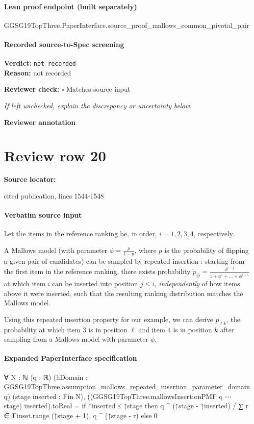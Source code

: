 \documentclass[10pt]{article}
\newcommand{\reviewerbox}{%
  \par\noindent\fbox{\parbox{0.96\linewidth}{\rule{0pt}{0.38in}}}\par
}
\newcommand{\reviewmatch}[1]{%
  \par\noindent\textbf{Reviewer check:} $\square$\; #1\par
  \noindent\emph{If left unchecked, explain the discrepancy or uncertainty below.}\par
}
\begin{document}
\paragraph{Lean proof endpoint (built separately)}\begin{ReviewVerbatim}
GGSG19TopThree.PaperInterface.source_proof_mallows_common_pivotal_pair
\end{ReviewVerbatim}

\paragraph{Recorded source-to-Spec screening}
\textbf{Verdict:} \texttt{not recorded}
\\
\textbf{Reason:} not recorded
\reviewmatch{Matches source input}
\noindent\textbf{Reviewer annotation}\par
\reviewerbox
\clearpage
\hypertarget{source-claim-909010c9cf279ba2}{}
\section*{Review row 20}
\textbf{Source locator:} {\footnotesize\raggedright cited publication, lines 1544-\allowbreak{}1548\par}
\paragraph{Verbatim source input}
\begin{ReviewVerbatim}
Let the items in the reference ranking be, in order, $i=1, 2, 3, 4$, respectively.

A Mallows model (with parameter $\phi = \frac{p}{1-p}$, where $p$ is the probability of flipping a given pair of candidates) can be sampled by repeated insertion \citep{lu14a,diaconis_group_nodate}: starting from the first item in the reference ranking, there exists probability $\tilde{p}_{ij} = \frac{\phi^{i-j}}{1 + \phi^1 + \dots + \phi^{i-1}}$ at which item $i$ can be inserted into position $j\leq i$, \textit{independently} of how items above it were inserted, such that the resulting ranking distribution matches the Mallows model.

Using this repeated insertion property for our example, we can derive $p_{\ell k}$, the probability at which item $3$ is in position $\ell$ and item $4$ is in position $k$ after sampling from a Mallows model with parameter $\phi$.
\end{ReviewVerbatim}


\paragraph{Expanded PaperInterface specification}
\begin{ReviewVerbatim}
∀ {N : ℕ} (q : ℝ) (hDomain : GGSG19TopThree.assumption_mallows_repeated_insertion_parameter_domain q)
  (stage inserted : Fin N),
  ((GGSG19TopThree.mallowsInsertionPMF q ⋯ stage) inserted).toReal =
    if ↑inserted ≤ ↑stage then q ^ (↑stage - ↑inserted) / ∑ r ∈ Finset.range (↑stage + 1), q ^ (↑stage - r) else 0
\end{ReviewVerbatim}
\end{document}
